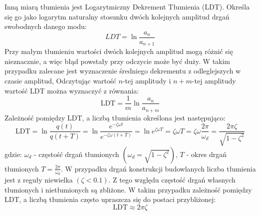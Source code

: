 Inną miarą tłumienia jest Logarytmiczny Dekrement Tłumienia (LDT). Określa się go jako logarytm naturalny stosunku dwóch kolejnych amplitud drgań swobodnych danego modu:
\begin{equation} \label{eq: LDT_1}
	LDT = \ln{\frac{a_n}{a_{n+1}}}
\end{equation}
Przy małym tłumieniu wartości dwóch kolejnych amplitud mogą różnić się nieznacznie, a więc błąd powstały przy odczycie może być duży. W takim przypadku zalecane jest wyznaczenie średniego dekrementu z odleglejszych w czasie amplitud, Odczytując wartość $n$-tej amplitudy i $n+m$-tej amplitudy wartość LDT można wyznaczyć z równania:
 \begin{equation} \label{eq: LDT_N}
 	\text{LDT} = \frac{1}{m}\ln{\frac{a_n}{a_{n+m}}}
 \end{equation}
Zależność pomiędzy LDT, a liczbą tłumienia określona jest następująco:
 \begin{equation} \label{eq: LDT_dampingratio}
	\text{LDT} = \ln{\frac{q(t)}{q(t+T)}}=\ln{\frac{e^{-\zeta\omega t}}{e^{-\zeta\omega(t+T)}}} =\ln{e^{\zeta\omega T}}=\zeta\omega T = \zeta\omega\frac{2\pi}{\omega_d}=\frac{2\pi\zeta}{\sqrt{1-\zeta^2}}
\end{equation}
gdzie: $\omega_d$ - częstość drgań tłumionych $(\omega_d=\sqrt{1-\zeta^2})$, $T$ - okres drgań tłumionych $T=\frac{2\pi}{\omega_d}$. W przypadku drgań konstrukcji budowlanych liczba tłumienia jest z reguły niewielka $(\zeta<0.1)$. Z tego względu częstość drgań własnych tłumionych i nietłumionych są zbliżone. W takim przypadku zależność pomiędzy LDT, a liczbą tłumienia często upraszcza się do postaci przybliżonej:
\begin{equation}
\text{LDT} \approx 2\pi\zeta
\end{equation}


